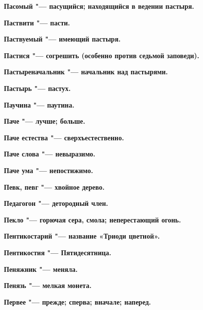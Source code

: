 \begin{mymulticols}{2}
\bfseries Пасомый\normalfont{} "--- пасущийся; находящийся в ведении пастыря. 




\bfseries Паствити\normalfont{} "--- пасти. 




\bfseries Паствуемый\normalfont{} "--- имеющий пастыря. 




\bfseries Пастися\normalfont{} "--- согрешить (особенно против седьмой заповеди). 




\bfseries Пастыреначальник\normalfont{} "--- начальник над пастырями. 




\bfseries Пастырь\normalfont{} "--- пастух. 




\bfseries Паучина\normalfont{} "--- паутина. 




\bfseries Паче\normalfont{} "--- лучше; больше. 




\bfseries Паче естества\normalfont{} "--- сверхъестественно. 




\bfseries Паче слова\normalfont{} "--- невыразимо. 




\bfseries Паче ума\normalfont{} "--- непостижимо. 




\bfseries Певк, певг\normalfont{} "--- хвойное дерево. 




\bfseries Педагогон\normalfont{} "--- детородный член. 




\bfseries Пекло\normalfont{} "--- горючая сера, смола; неперестающий огонь. 




\bfseries Пентикостарий\normalfont{} "--- название «Триоди цветной». 




\bfseries Пентикостия\normalfont{} "--- Пятидесятница. 




\bfseries Пеняжник\normalfont{} "--- меняла. 




\bfseries Пенязь\normalfont{} "--- мелкая монета. 




\bfseries Первее\normalfont{} "--- прежде; сперва; вначале; наперед. 





\end{mymulticols}
